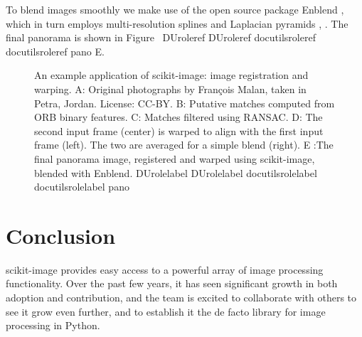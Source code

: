 \documentclass[fleqn,12pt]{wlpeerj}
\providecommand*{\DUrole}[2]{%
  \ifcsname DUrole#1\endcsname%
    \csname DUrole#1\endcsname{#2}%
  \else%
    \ifcsname docutilsrole#1\endcsname%
      \csname docutilsrole#1\endcsname{#2}%
    \else%
      #2%
    \fi%
  \fi%
}
\begin{document}
To blend images smoothly we make use of the open source package Enblend
\cite{Enblend}, which in turn employs multi-resolution splines and Laplacian
pyramids \cite{burt_adelson_0}, \cite{burt_adelson_1}.  The final panorama is shown in
Figure~\DUrole{ref}{pano} E.\begin{figure}[bht]\noindent{}
\caption{An example application of scikit-image: image registration and warping.
A: Original photographs by François Malan, taken in Petra, Jordan. License:
CC-BY.
B: Putative matches computed from ORB binary features.
C: Matches filtered using RANSAC.
D: The second input frame (center) is warped to align with the first input
frame (left). The two are averaged for a simple blend (right).
E :The final panorama image, registered and warped using scikit-image,
blended with Enblend.
\DUrole{label}{pano}}
\end{figure}

\section*{Conclusion}
  \label{conclusion}

scikit-image provides easy access to a powerful array of image processing
functionality.  Over the past few years, it has seen significant growth in both
adoption and contribution, and the team is excited to collaborate with others
to see it grow even further, and to establish it the de facto library for image
processing in Python.
\end{document}
